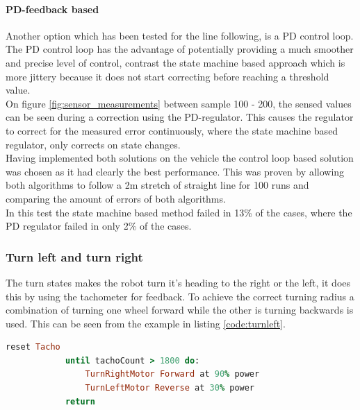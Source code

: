 \documentclass[final, english, a4paper]{article}
\begin{document}
            \paragraph{PD-feedback based}
            Another option which has been tested for the line following, is a PD control loop.
            The PD control loop has the advantage of potentially providing a much smoother and precise level of control, contrast the state machine based approach which is more jittery because it does not start correcting before reaching a threshold value.\\
            On figure \ref{fig:sensor_measurements} between sample 100 - 200,
            the sensed values can be seen during a correction using the PD-regulator.
            This causes the regulator to correct for the measured error 
            continuously, where the state machine based regulator, only corrects on state
            changes.
            \\
            Having implemented both solutions on the vehicle the control loop based
            solution was chosen as it had clearly the best performance. This
            was proven by allowing both algorithms to follow a 2m stretch of
            straight line for 100 runs and comparing the amount of errors of both algorithms.
            \\
            In this test the state machine based method failed in 13\% of the
            cases, where the PD regulator failed in only 2\% of the cases.
             
            
            
	    \subsubsection{Turn left and turn right}
	        The turn states makes the robot turn it's heading to
	        the right or the left,
	        it does this by using the tachometer for feedback.
	        To achieve the correct turning radius a combination of turning one
	        wheel forward while the other is turning backwards is used. This
	        can be seen from the example in listing \ref{code:turnleft}.
	        \begin{lstlisting}[language=Ruby, frame=single, basicstyle=\small, caption={TurnLeft Pseudo example}, label={code:turnleft}]
	        reset Tacho
	        until tachoCount > 1800 do:
	            TurnRightMotor Forward at 90% power
	            TurnLeftMotor Reverse at 30% power
	        return
	        \end{lstlisting}
\end{document}
